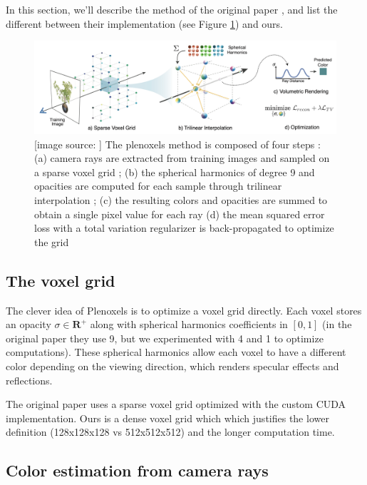 \documentclass{article}
\begin{document}
In this section, we'll describe the method of the original paper \cite{plenoxels}, and list the different between their implementation (see Figure \ref{fig:plenoxel}) and ours.



\begin{figure}[!h]
\centering
\includegraphics[width=1.\textwidth]{figs/plen_pipeline.png}
\caption{\label{fig:plenoxel} [image source: \cite{plenoxels}] The plenoxels method is composed of four steps : (a) camera rays are extracted from training images and sampled on a sparse voxel grid ; (b) the spherical harmonics of degree 9 and opacities are computed for each sample through trilinear interpolation ; (c) the resulting colors and opacities are summed to obtain a single pixel value for each ray (d) the mean squared error loss with a total variation regularizer is back-propagated to optimize the grid}
\end{figure}



\subsection{The voxel grid}

The clever idea of Plenoxels is to optimize a voxel grid directly. Each voxel stores an opacity $\sigma \in \mathbf{R}^+$ along with spherical harmonics coefficients in $[0,1]$ (in the original paper they use 9, but we experimented with 4 and 1 to optimize computations). These spherical harmonics allow each voxel to have a different color depending on the viewing direction, which renders specular effects and reflections.

The original paper uses a sparse voxel grid optimized with the custom CUDA implementation. Ours is a dense voxel grid which which justifies the lower definition (128x128x128 vs 512x512x512) and the longer computation time.

\subsection{Color estimation from camera rays}
\end{document}

